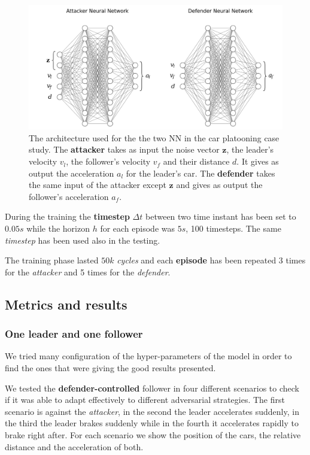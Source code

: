 \begin{figure}[H]
	\centering
	\includegraphics[width=12cm, keepaspectratio]{img/5_3_NNplatooning.png}
	\caption{The architecture used for the the two NN in the car platooning case study. The \textbf{attacker} takes as input the noise vector $\textbf{z}$, the leader's velocity $v_l$, the follower's velocity $v_f$ and their distance $d$. It gives as output the acceleration $a_l$ for the leader's car. The \textbf{defender} takes the same input of the attacker except $\textbf{z}$ and gives as output the follower's acceleration $a_f$.}
\end{figure}

During the training the \textbf{timestep} $\Delta t$ between two time instant has been set to $0.05s$ while the horizon $h$ for each episode was $5s$, 100 timesteps.
The same \textit{timestep} has been used also in the testing.

The training phase lasted $50k$ \textit{cycles} and each \textbf{episode} has been repeated 3 times for the \textit{attacker} and 5 times for the \textit{defender}.

\subsection{Metrics and results}

\subsubsection{One leader and one follower}
We tried many configuration of the hyper-parameters of the model in order to find the ones that were giving the good results presented.

We tested the \textbf{defender-controlled} follower in four different scenarios to check if it was able to adapt effectively to different adversarial strategies.
The first scenario is against the \textit{attacker}, in the second the leader accelerates suddenly, in the third the leader brakes suddenly while in the fourth it accelerates rapidly to brake right after.
For each scenario we show the position of the cars, the relative distance and the acceleration of both.

